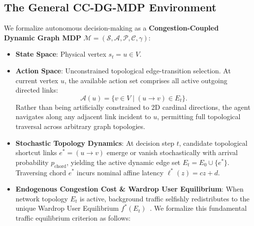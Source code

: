 \documentclass[11pt,a4paper]{article}
\begin{document}
\subsection{The General CC-DG-MDP Environment}
We formalize autonomous decision-making as a \textbf{Congestion-Coupled Dynamic Graph MDP} $\mathcal{M} = (\mathcal{S}, \mathcal{A}, \mathcal{P}, \mathcal{C}, \gamma)$:
\begin{itemize}
    \item \textbf{State Space}: Physical vertex $s_t = u \in V$.
    \item \textbf{Action Space}: Unconstrained topological edge-transition selection. At current vertex $u$, the available action set comprises all active outgoing directed links:
    \begin{equation}
    \mathcal{A}(u) = \{ v \in V \mid (u \to v) \in E_t \}.
    \end{equation}
    Rather than being artificially constrained to 2D cardinal directions, the agent navigates along any adjacent link incident to $u$, permitting full topological traversal across arbitrary graph topologies.
    \item \textbf{Stochastic Topology Dynamics}: At decision step $t$, candidate topological shortcut links $e^* = (u \to v)$ emerge or vanish stochastically with arrival probability $p_{\text{chord}}$, yielding the active dynamic edge set $E_t = E_0 \cup \{e^*\}$. Traversing chord $e^*$ incurs nominal affine latency $\ell^*(z) = c z + d$.
    \item \textbf{Endogenous Congestion Cost \& Wardrop User Equilibrium}: When network topology $E_t$ is active, background traffic selfishly redistributes to the unique Wardrop User Equilibrium $f^*(E_t)$~\cite{wardrop1952road}. We formalize this fundamental traffic equilibrium criterion as follows:


\end{itemize}
\end{document}
